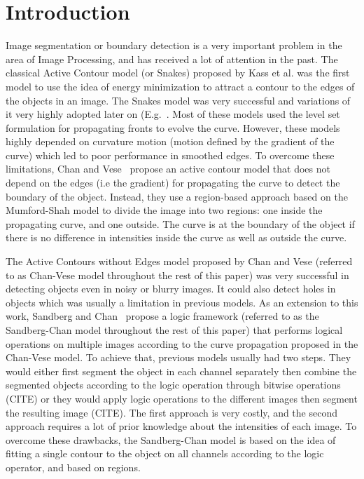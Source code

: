 \documentclass[10pt,twocolumn,letterpaper]{article}
\begin{document}
\section{Introduction}
Image segmentation or boundary detection is a very important problem in the area of Image Processing, and has received a lot of attention in the past. The
classical Active Contour model (or Snakes) proposed by Kass et al. \cite{kass1988snakes} was the first model to use the idea of energy minimization to attract
a contour to the edges of the objects in an image. The Snakes model was very successful and variations of it very highly adopted later on
(E.g.~\cite{caselles1997geodesic}. Most of these models used the level set formulation for propagating fronts to evolve the curve. However, these models highly
depended on curvature motion (motion defined by the gradient of the curve) which led to poor performance in smoothed edges. To overcome these limitations, Chan
and Vese~\cite{chan2001active} propose an active contour model that does not depend on the edges (i.e the gradient) for propagating the curve to detect the
boundary of the object. Instead, they use a region-based approach based on the Mumford-Shah model \cite{mumford1989optimal} to divide the image
into two regions: one inside the propagating curve, and one outside. The curve is at the boundary of the object if there is no difference in intensities inside
the curve as well as outside the curve.

The Active Contours without Edges model proposed by Chan and Vese (referred to as Chan-Vese model throughout the rest of this paper) was very successful in
detecting objects even in noisy or blurry images. It could also detect holes in objects which was usually a limitation in previous models. As an extension to
this work, Sandberg and Chan~\cite{sandberg2005logic} propose a logic framework (referred to as the Sandberg-Chan model throughout the rest of this
paper) that  performs logical operations on multiple images according to the curve propagation proposed in the Chan-Vese model. To achieve that, previous models
usually had two steps. They would either first segment the object in each channel separately then combine the segmented objects according to the logic operation
through bitwise operations (CITE) or they would apply logic operations to the different images then segment the resulting image (CITE). The first approach is
very costly, and the second approach requires a lot of prior knowledge about the intensities of each image. To overcome these drawbacks, the Sandberg-Chan
model is based on the idea of fitting a single contour to the object on all channels according to the logic operator, and based on regions.
\end{document}
